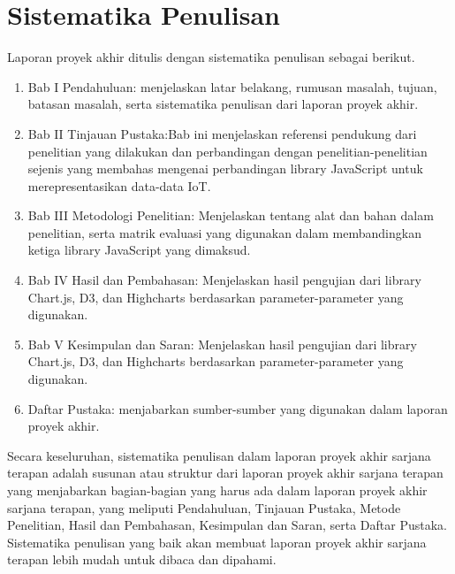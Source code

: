 \section{Sistematika Penulisan}
Laporan proyek akhir ditulis dengan sistematika penulisan sebagai berikut.
\begin{enumerate}
    \item Bab I Pendahuluan: menjelaskan latar belakang, rumusan masalah, tujuan, batasan masalah, serta sistematika penulisan dari laporan proyek akhir.
    \item Bab II Tinjauan Pustaka:Bab ini menjelaskan referensi pendukung dari penelitian yang dilakukan dan perbandingan dengan penelitian-penelitian sejenis yang membahas mengenai perbandingan library JavaScript untuk merepresentasikan data-data IoT. 
    \item Bab III Metodologi Penelitian: Menjelaskan tentang alat dan bahan dalam penelitian, serta matrik evaluasi yang digunakan dalam membandingkan ketiga library JavaScript yang dimaksud.  
    \item Bab IV Hasil dan Pembahasan: Menjelaskan hasil pengujian dari library Chart.js, D3, dan Highcharts berdasarkan parameter-parameter yang digunakan.
    \item Bab V Kesimpulan dan Saran: Menjelaskan hasil pengujian dari library Chart.js, D3, dan Highcharts berdasarkan parameter-parameter yang digunakan.
    \item Daftar Pustaka: menjabarkan sumber-sumber yang digunakan dalam laporan proyek akhir.
\end{enumerate}

Secara keseluruhan, sistematika penulisan dalam laporan proyek akhir sarjana terapan adalah susunan atau struktur dari laporan proyek akhir sarjana terapan yang menjabarkan bagian-bagian yang harus ada dalam laporan proyek akhir sarjana terapan, yang meliputi Pendahuluan, Tinjauan Pustaka, Metode Penelitian, Hasil dan Pembahasan, Kesimpulan dan Saran, serta Daftar Pustaka. Sistematika penulisan yang baik akan membuat laporan proyek akhir sarjana terapan lebih mudah untuk dibaca dan dipahami.